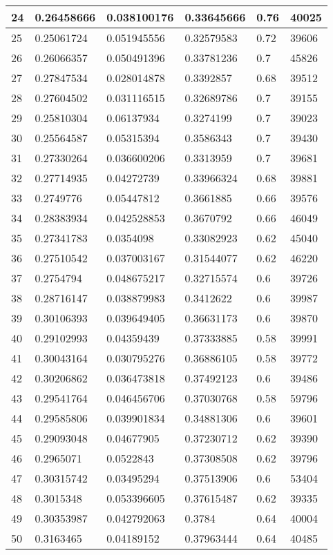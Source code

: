 \begin{longtable}{|l|l|l|l|l|l|}
24 & 0.26458666 & 0.038100176 & 0.33645666 & 0.76 & 40025 \\ \hline 
25 & 0.25061724 & 0.051945556 & 0.32579583 & 0.72 & 39606 \\ \hline 
26 & 0.26066357 & 0.050491396 & 0.33781236 & 0.7 & 45826 \\ \hline 
27 & 0.27847534 & 0.028014878 & 0.3392857 & 0.68 & 39512 \\ \hline 
28 & 0.27604502 & 0.031116515 & 0.32689786 & 0.7 & 39155 \\ \hline 
29 & 0.25810304 & 0.06137934 & 0.3274199 & 0.7 & 39023 \\ \hline 
30 & 0.25564587 & 0.05315394 & 0.3586343 & 0.7 & 39430 \\ \hline 
31 & 0.27330264 & 0.036600206 & 0.3313959 & 0.7 & 39681 \\ \hline 
32 & 0.27714935 & 0.04272739 & 0.33966324 & 0.68 & 39881 \\ \hline 
33 & 0.2749776 & 0.05447812 & 0.3661885 & 0.66 & 39576 \\ \hline 
34 & 0.28383934 & 0.042528853 & 0.3670792 & 0.66 & 46049 \\ \hline 
35 & 0.27341783 & 0.0354098 & 0.33082923 & 0.62 & 45040 \\ \hline 
36 & 0.27510542 & 0.037003167 & 0.31544077 & 0.62 & 46220 \\ \hline 
37 & 0.2754794 & 0.048675217 & 0.32715574 & 0.6 & 39726 \\ \hline 
38 & 0.28716147 & 0.038879983 & 0.3412622 & 0.6 & 39987 \\ \hline 
39 & 0.30106393 & 0.039649405 & 0.36631173 & 0.6 & 39870 \\ \hline 
40 & 0.29102993 & 0.04359439 & 0.37333885 & 0.58 & 39991 \\ \hline 
41 & 0.30043164 & 0.030795276 & 0.36886105 & 0.58 & 39772 \\ \hline 
42 & 0.30206862 & 0.036473818 & 0.37492123 & 0.6 & 39486 \\ \hline 
43 & 0.29541764 & 0.046456706 & 0.37030768 & 0.58 & 59796 \\ \hline 
44 & 0.29585806 & 0.039901834 & 0.34881306 & 0.6 & 39601 \\ \hline 
45 & 0.29093048 & 0.04677905 & 0.37230712 & 0.62 & 39390 \\ \hline 
46 & 0.2965071 & 0.0522843 & 0.37308508 & 0.62 & 39796 \\ \hline 
47 & 0.30315742 & 0.03495294 & 0.37513906 & 0.6 & 53404 \\ \hline 
48 & 0.3015348 & 0.053396605 & 0.37615487 & 0.62 & 39335 \\ \hline 
49 & 0.30353987 & 0.042792063 & 0.3784 & 0.64 & 40004 \\ \hline 
50 & 0.3163465 & 0.04189152 & 0.37963444 & 0.64 & 40485 \\ \hline 
\end{longtable}